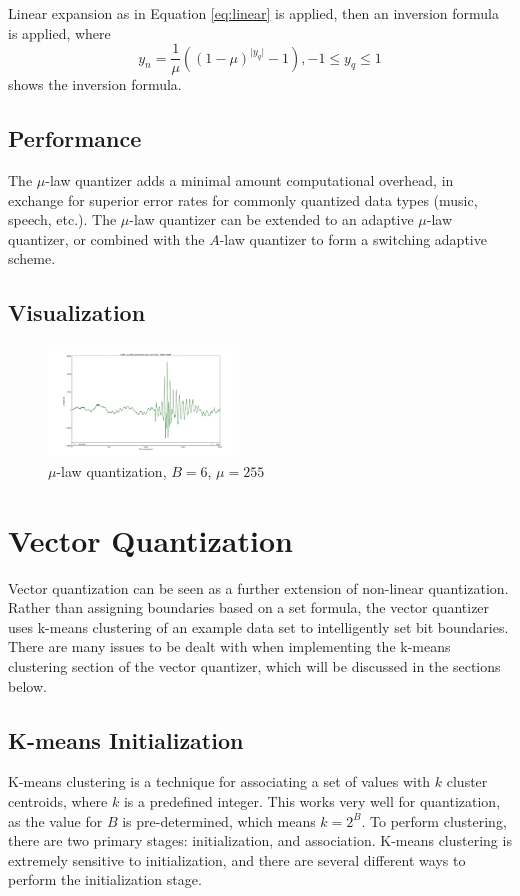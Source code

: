 \documentclass[journal]{IEEEtran}
\begin{document}
Linear expansion as in Equation \ref{eq:linear} is applied, then an inversion formula is applied, where  
\begin{equation}
    y_n = \frac{1}{\mu}((1-\mu)^{\lvert y_q \rvert}-1), -1 \le y_q \le 1
\end{equation}
shows the inversion formula.

\subsection{Performance}
The $\mu$-law quantizer adds a minimal amount computational overhead, in exchange for superior error rates for commonly quantized data types
(music, speech, etc.). The $\mu$-law quantizer can be extended to an adaptive $\mu$-law quantizer, or combined with the $A$-law quantizer to
form a switching adaptive scheme.

\subsection{Visualization}
\begin{figure}[h!]
\centering
  \includegraphics[width=0.45\textwidth]{mu_6bit.png}
\caption{$\mu$-law quantization, $B = 6$, $\mu = 255$}
\label{fig:mu}
\end{figure}

\section{Vector Quantization}
Vector quantization can be seen as a further extension of non-linear quantization. Rather than assigning boundaries based on a set formula, the 
vector quantizer uses k-means clustering of an example data set to intelligently set bit boundaries. There are many issues to be dealt with 
when implementing the k-means clustering section of the vector quantizer, which will be discussed in the sections below.

\subsection{K-means Initialization}
K-means clustering is a technique for associating a set of values with $k$ cluster centroids, where $k$ is a predefined integer. This works very well for 
quantization, as the value for $B$ is pre-determined, which means $k = 2^B$. To perform clustering, there are two primary stages: initialization, 
and association. K-means clustering is extremely sensitive to initialization, and there are several different ways to perform the initialization stage. 
\end{document}
